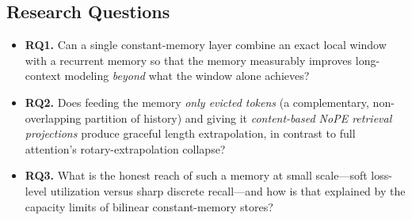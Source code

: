 \documentclass[letterpaper]{article} %
\begin{document}
\subsection{Research Questions}
\begin{itemize}
  \item \textbf{RQ1.} Can a single constant-memory layer combine an exact local window with a recurrent memory so that the memory measurably improves long-context modeling \emph{beyond} what the window alone achieves?
  \item \textbf{RQ2.} Does feeding the memory \emph{only evicted tokens} (a complementary, non-overlapping partition of history) and giving it \emph{content-based NoPE retrieval projections} produce graceful length extrapolation, in contrast to full attention's rotary-extrapolation collapse?
  \item \textbf{RQ3.} What is the honest reach of such a memory at small scale---soft loss-level utilization versus sharp discrete recall---and how is that explained by the capacity limits of bilinear constant-memory stores?
\end{itemize}
\end{document}
